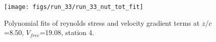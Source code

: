 \begin{figure}[H]
\centering
\texttt{[image: figs/run\_33/run\_33\_nut\_tot\_fit]}
\caption{Polynomial fits of reynolds stress and velocity gradient terms at $z/c$=8.50, $V_{free}$=19.08, station 4.}
\label{fig:run_33_nut_tot_fit}
\end{figure}


